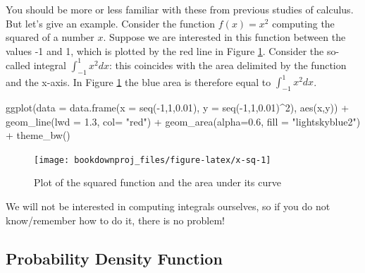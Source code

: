\documentclass[
]{book}
\newenvironment{Shaded}{\begin{snugshade}}{\end{snugshade}}
\newcommand{\AttributeTok}[1]{\textcolor[rgb]{0.77,0.63,0.00}{#1}}
\newcommand{\DecValTok}[1]{\textcolor[rgb]{0.00,0.00,0.81}{#1}}
\newcommand{\FloatTok}[1]{\textcolor[rgb]{0.00,0.00,0.81}{#1}}
\newcommand{\FunctionTok}[1]{\textcolor[rgb]{0.00,0.00,0.00}{#1}}
\newcommand{\NormalTok}[1]{#1}
\newcommand{\SpecialCharTok}[1]{\textcolor[rgb]{0.00,0.00,0.00}{#1}}
\newcommand{\StringTok}[1]{\textcolor[rgb]{0.31,0.60,0.02}{#1}}
\begin{document}
You should be more or less familiar with these from previous studies of calculus. But let's give an example. Consider the function \(f(x)=x^2\) computing the squared of a number \(x\). Suppose we are interested in this function between the values -1 and 1, which is plotted by the red line in Figure \ref{fig:x-sq}. Consider the so-called integral \(\int_{-1}^{1}x^2dx\): this coincides with the area delimited by the function and the x-axis. In Figure \ref{fig:x-sq} the blue area is therefore equal to \(\int_{-1}^{1}x^2dx\).

\begin{Shaded}
\begin{Highlighting}[]
\FunctionTok{ggplot}\NormalTok{(}\AttributeTok{data =} \FunctionTok{data.frame}\NormalTok{(}\AttributeTok{x =} \FunctionTok{seq}\NormalTok{(}\SpecialCharTok{{-}}\DecValTok{1}\NormalTok{,}\DecValTok{1}\NormalTok{,}\FloatTok{0.01}\NormalTok{), }\AttributeTok{y =} \FunctionTok{seq}\NormalTok{(}\SpecialCharTok{{-}}\DecValTok{1}\NormalTok{,}\DecValTok{1}\NormalTok{,}\FloatTok{0.01}\NormalTok{)}\SpecialCharTok{\^{}}\DecValTok{2}\NormalTok{), }\FunctionTok{aes}\NormalTok{(x,y)) }\SpecialCharTok{+} \FunctionTok{geom\_line}\NormalTok{(}\AttributeTok{lwd =} \FloatTok{1.3}\NormalTok{, }\AttributeTok{col=} \StringTok{"red"}\NormalTok{) }\SpecialCharTok{+} \FunctionTok{geom\_area}\NormalTok{(}\AttributeTok{alpha=}\FloatTok{0.6}\NormalTok{, }\AttributeTok{fill =} \StringTok{"lightskyblue2"}\NormalTok{) }\SpecialCharTok{+}  \FunctionTok{theme\_bw}\NormalTok{() }
\end{Highlighting}
\end{Shaded}

\begin{figure}

{\centering \texttt{[image: bookdownproj\_files/figure-latex/x-sq-1]} 

}

\caption{Plot of the squared function and the area under its curve}\label{fig:x-sq}
\end{figure}

We will not be interested in computing integrals ourselves, so if you do not know/remember how to do it, there is no problem!

\hypertarget{probability-density-function}{%
\subsection{Probability Density Function}\label{probability-density-function}}
\end{document}
